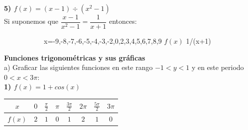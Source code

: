\documentclass[11pt]{report}
\begin{document}
\pagebreak \indent \textbf { 5) $f(x) = (x-1) \div (x^2-1)$ }\\[2mm]
Si suponemos que $\dfrac{x-1}{x^2-1}=\dfrac{1}{x+1}$ entonces:
\begin{center}
    \begin{figure}[h]
        \begin{subfigure}{0.4\textwidth}
                {x=-9,-8,-7,-6,-5,-4,-3,-2,0,2,3,4,5,6,7,8,9} 
                {$f(x)$}
                {1/(x+1)}
        \end{subfigure}
        \begin{subfigure}{0.5\textwidth}
			\begin{center}
			\end{center}
        \end{subfigure}
    \end{figure}
\end{center}
\pagebreak \textbf {Funciones trigonométricas y sus gráficas}\\[2mm]
a) Graficar las siguientes funciones en este rango $-1 < y < 1$ y en este periodo $0 < x < 3\pi$:\\[2mm]
\indent \textbf { 1) $f(x) = 1 + cos(x)$ }\\[2mm]
\begin{center}
\renewcommand{\arraystretch}{2}
\begin{tabular}{|c|c|c|c|c|c|c|c|}
\hline
$x$ &$0$ &$\frac{\pi}{2}$ &$\pi$ &$\frac{3\pi}{2}$ &$2\pi$ &$\frac{5\pi}{2}$ &$3\pi$ \\
\hline
$f(x)$&$2$ &$1$ &$0$ &$1$ &$2$ &$1$ &$0$ \\
\hline
\end{tabular}
\renewcommand{\arraystretch}{1}
\end{center}
\end{document}
